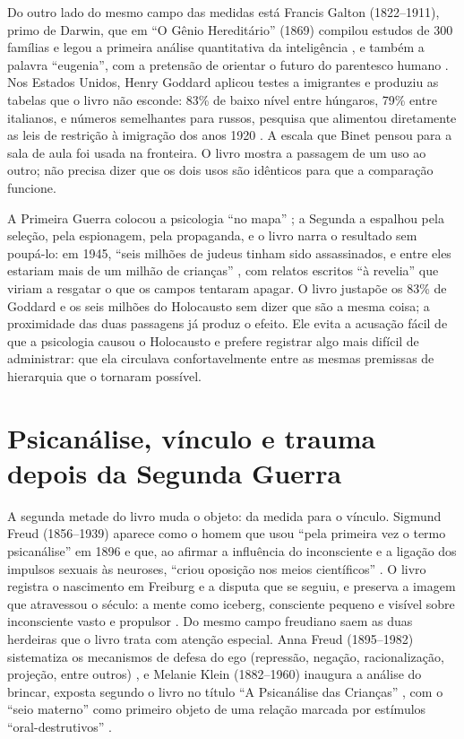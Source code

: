 \documentclass[12pt]{article}
\begin{document}
Do outro lado do mesmo campo das medidas está Francis Galton (1822--1911), primo de Darwin, que em ``O Gênio Hereditário'' (1869) compilou estudos de 300 famílias e legou a primeira análise quantitativa da inteligência \cite[p. 12]{machado}, e também a palavra ``eugenia'', com a pretensão de orientar o futuro do parentesco humano \cite[p. 26]{machado}. Nos Estados Unidos, Henry Goddard aplicou testes a imigrantes e produziu as tabelas que o livro não esconde: 83\% de baixo nível entre húngaros, 79\% entre italianos, e números semelhantes para russos, pesquisa que alimentou diretamente as leis de restrição à imigração dos anos 1920 \cite[p. 101]{machado}. A escala que Binet pensou para a sala de aula foi usada na fronteira. O livro mostra a passagem de um uso ao outro; não precisa dizer que os dois usos são idênticos para que a comparação funcione.

A Primeira Guerra colocou a psicologia ``no mapa'' \cite[p. 100]{machado}; a Segunda a espalhou pela seleção, pela espionagem, pela propaganda, e o livro narra o resultado sem poupá-lo: em 1945, ``seis milhões de judeus tinham sido assassinados, e entre eles estariam mais de um milhão de crianças'' \cite[p. 95]{machado}, com relatos escritos ``à revelia'' que viriam a resgatar o que os campos tentaram apagar. O livro justapõe os 83\% de Goddard e os seis milhões do Holocausto sem dizer que são a mesma coisa; a proximidade das duas passagens já produz o efeito. Ele evita a acusação fácil de que a psicologia causou o Holocausto e prefere registrar algo mais difícil de administrar: que ela circulava confortavelmente entre as mesmas premissas de hierarquia que o tornaram possível.

\section{Psicanálise, vínculo e trauma depois da Segunda Guerra}

A segunda metade do livro muda o objeto: da medida para o vínculo. Sigmund Freud (1856--1939) aparece como o homem que usou ``pela primeira vez o termo psicanálise'' em 1896 e que, ao afirmar a influência do inconsciente e a ligação dos impulsos sexuais às neuroses, ``criou oposição nos meios científicos'' \cite[p. 34]{machado}. O livro registra o nascimento em Freiburg e a disputa que se seguiu, e preserva a imagem que atravessou o século: a mente como iceberg, consciente pequeno e visível sobre inconsciente vasto e propulsor \cite[p. 53]{machado}. Do mesmo campo freudiano saem as duas herdeiras que o livro trata com atenção especial. Anna Freud (1895--1982) sistematiza os mecanismos de defesa do ego (repressão, negação, racionalização, projeção, entre outros) \cite[p. 39]{machado}, e Melanie Klein (1882--1960) inaugura a análise do brincar, exposta segundo o livro no título ``A Psicanálise das Crianças'' \cite[p. 53]{machado}, com o ``seio materno'' como primeiro objeto de uma relação marcada por estímulos ``oral-destrutivos'' \cite[p. 46]{machado}.
\end{document}
